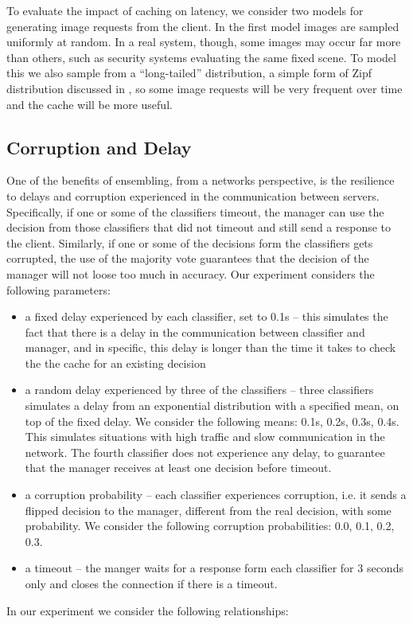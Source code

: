 \documentclass[11pt]{article}
\begin{document}
To evaluate the impact of caching on latency, we consider two models for generating image requests from the client. In the first model images are sampled uniformly at random. In a real system, though, some images may occur far more than others, such as security systems evaluating the same fixed scene. To model this we also sample from a ``long-tailed'' distribution, a simple form of Zipf distribution discussed in \cite{mitzenmacher}, so some image requests will be very frequent over time and the cache will be more useful.

\subsection{Corruption and Delay}

One of the benefits of ensembling, from a networks perspective, is the resilience to delays and corruption experienced in the communication between servers. Specifically, if one or some of the classifiers timeout, the manager can use the decision from those classifiers that did not timeout and still send a response to the client. Similarly, if one or some of the decisions form the classifiers gets corrupted, the use of the majority vote guarantees that the decision of the manager will not loose too much in accuracy. Our experiment considers the following parameters:

\begin{itemize}
	\item a fixed delay experienced by each classifier, set to 0.1s – this simulates the fact that there is a delay in the communication between classifier and manager, and in specific, this delay is longer than the time it takes to check the the cache for an existing decision 
	\item a random delay experienced by three of the classifiers – three classifiers simulates a delay from an exponential distribution with a specified mean, on top of the fixed delay. We consider the following means: 0.1s, 0.2s, 0.3s, 0.4s. This simulates situations with high traffic and slow communication in the network. The fourth classifier does not experience any delay, to guarantee that the manager receives at least one decision before timeout. 
	\item a corruption probability – each classifier experiences corruption, i.e. it sends a flipped decision to the manager, different from the real decision, with some probability. We consider the following corruption probabilities: 0.0, 0.1, 0.2, 0.3. 
	\item 	a timeout – the manger waits for a response form each classifier for 3 seconds only and closes the connection if there is a timeout. 
\end{itemize}
In our experiment we consider the following relationships:
\end{document}
